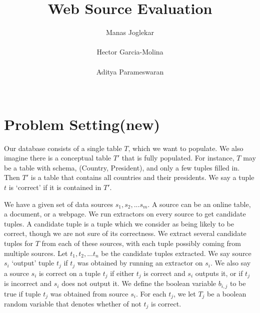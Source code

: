 \documentclass{sig-alternate}
\begin{document}
\title{Web Source Evaluation}
\author{
\alignauthor
Manas Joglekar\\
       \\
\alignauthor
Hector Garcia-Molina\\
       \\
\alignauthor 
Aditya Parameswaran\\
       \\
}
\maketitle

\begin{abstract}
\end{abstract}

\section{Problem Setting(new)}
Our database consists of a single table $T$, which we want to populate. We also imagine there is a conceptual table $T'$ that is fully populated. For instance, $T$ may be a table with schema, (Country, President), and only a few tuples filled in. Then $T'$ is a table that contains all countries and their presidents. We say a tuple $t$ is `correct' if it is contained in $T'$. 

We have a given set of data sources $s_1, s_2, ... s_m$. A source can be an online table, a document, or a webpage. We run extractors on every source to get candidate tuples. A candidate tuple is a tuple which we consider as being likely to be correct, though we are not sure of its correctness. We extract several candidate tuples for $T$ from each of these sources, with each tuple possibly coming from multiple sources. Let $t_1, t_2, ... t_n$ be the candidate tuples extracted. We say source $s_i$ `output' tuple $t_j$ if $t_j$ was obtained by running an extractor on $s_i$. We also say a source $s_i$ is correct on a tuple $t_j$ if either $t_j$ is correct and $s_i$ outputs it, or if $t_j$ is incorrect and $s_i$ does not output it. We define the boolean variable $b_{i,j}$ to be true if tuple $t_j$ was obtained from source $s_i$. For each $t_j$, we let $T_j$ be a boolean random variable that denotes whether of not $t_j$ is correct. 
\end{document}
